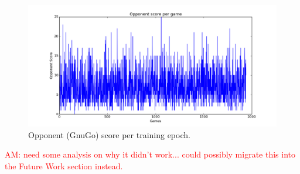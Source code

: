 \begin{figure}[h!]
\centering
\includegraphics[scale=0.5]{training_score.png}
\caption{Opponent (GnuGo) score per training epoch.}
\label{fig:score}
\end{figure}


\textcolor{red}{AM: need some analysis on why it didn't work... could possibly migrate this into the Future Work section instead.}